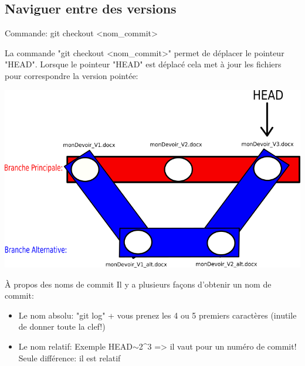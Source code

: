 \documentclass{beamer}
\begin{document}
\subsection{Naviguer entre des versions}
\begin{frame}{Commande: git checkout <nom\_commit>}

La commande "git checkout <nom\_commit>" permet de déplacer le pointeur "HEAD". Lorsque le pointeur "HEAD" est déplacé cela met à jour les fichiers pour correspondre la version pointée:
\begin{center}
    \includegraphics[scale=0.45]{images/consulter_versions/secondScenario_branches.png}
\end{center}
\end{frame}

\begin{frame}{À propos des noms de commit}
Il y a plusieurs façons d'obtenir un nom de commit:
\begin{itemize}
    \item Le nom absolu: "git log" + vous prenez les 4 ou 5 premiers caractères (inutile de donner toute la clef!)
    \item Le nom relatif: Exemple HEAD$\sim$2\string^3 => il vaut pour un numéro de commit! Seule différence: il est relatif
\end{itemize}
\end{frame}
\end{document}
